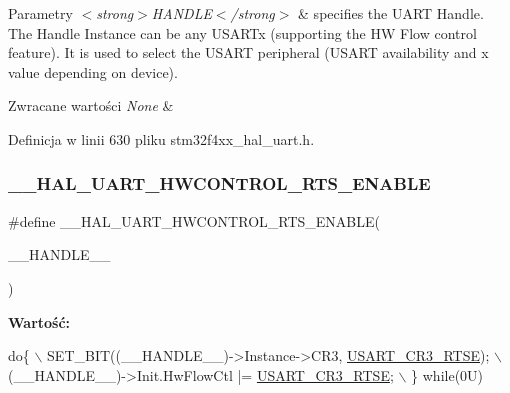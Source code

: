 \begin{DoxyParams}{Parametry}
{\em $<$strong$>$\+H\+A\+N\+D\+L\+E$<$/strong$>$} & specifies the U\+A\+RT Handle. The Handle Instance can be any U\+S\+A\+R\+Tx (supporting the HW Flow control feature). It is used to select the U\+S\+A\+RT peripheral (U\+S\+A\+RT availability and x value depending on device). \\
\hline
\end{DoxyParams}

\begin{DoxyRetVals}{Zwracane wartości}
{\em None} & \\
\hline
\end{DoxyRetVals}


Definicja w linii 630 pliku stm32f4xx\+\_\+hal\+\_\+uart.\+h.

\mbox{\label{group___u_a_r_t___exported___macros_ga017ec9001ff33136f87cc4034b2709a6}} 
\subsubsection{\texorpdfstring{\+\_\+\+\_\+\+H\+A\+L\+\_\+\+U\+A\+R\+T\+\_\+\+H\+W\+C\+O\+N\+T\+R\+O\+L\+\_\+\+R\+T\+S\+\_\+\+E\+N\+A\+B\+LE}{\_\_HAL\_UART\_HWCONTROL\_RTS\_ENABLE}}
{\footnotesize\ttfamily \#define \+\_\+\+\_\+\+H\+A\+L\+\_\+\+U\+A\+R\+T\+\_\+\+H\+W\+C\+O\+N\+T\+R\+O\+L\+\_\+\+R\+T\+S\+\_\+\+E\+N\+A\+B\+LE(\begin{DoxyParamCaption}\item[{}]{\+\_\+\+\_\+\+H\+A\+N\+D\+L\+E\+\_\+\+\_\+ }\end{DoxyParamCaption})}

{\bfseries Wartość\+:}
\begin{DoxyCode}
\textcolor{keywordflow}{do}\{                                                     \(\backslash\)
    SET\_BIT((\_\_HANDLE\_\_)->Instance->CR3, \hyperlink{group___peripheral___registers___bits___definition_ga7c5d6fcd84a4728cda578a0339b4cac2}{USART\_CR3\_RTSE}); \(\backslash\)
    (\_\_HANDLE\_\_)->Init.HwFlowCtl |= \hyperlink{group___peripheral___registers___bits___definition_ga7c5d6fcd84a4728cda578a0339b4cac2}{USART\_CR3\_RTSE};       \(\backslash\)
  \} \textcolor{keywordflow}{while}(0U)
\end{DoxyCode}



